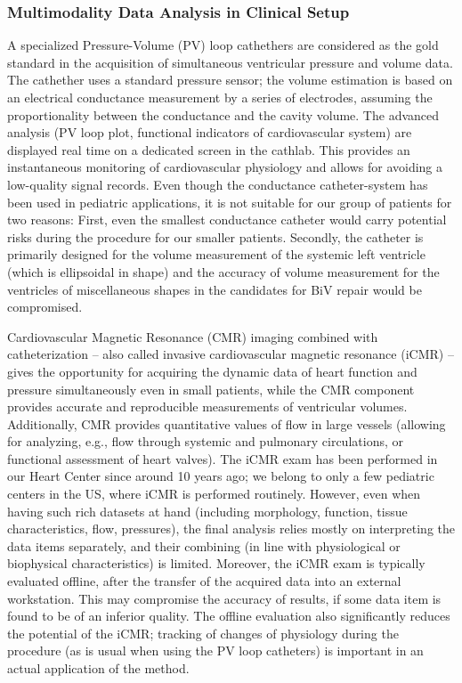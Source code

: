 \subsubsection{Multimodality Data Analysis in Clinical Setup}
A specialized Pressure-Volume (PV) loop cathethers are considered as the gold standard in the acquisition of simultaneous ventricular pressure and volume data. The cathether uses a standard pressure sensor; the volume estimation is based on an electrical conductance measurement by a series of electrodes, assuming the proportionality between the conductance and the cavity volume. 
The advanced analysis (PV loop plot, functional indicators of cardiovascular system) are displayed real time on a dedicated screen in the cathlab. This  provides an instantaneous monitoring of cardiovascular physiology and allows for avoiding a low-quality signal records.  Even though the conductance catheter-system has been used in pediatric applications\cite{hiremath2023_PVloop_review}, it is not suitable for our group of patients for two reasons: First, even the smallest conductance catheter would carry potential risks during the procedure for our smaller patients. Secondly, the catheter is primarily designed for the volume measurement of the systemic left ventricle (which is ellipsoidal in shape) and the accuracy of volume measurement for the ventricles of miscellaneous shapes in the candidates for BiV repair would be compromised.

Cardiovascular Magnetic Resonance (CMR) imaging combined with catheterization -- also called invasive cardiovascular magnetic resonance  (iCMR)\cite{reddy2020_iCMR} -- gives the opportunity for acquiring the dynamic data of heart function and pressure simultaneously even in small patients, while the CMR component provides accurate and reproducible measurements of ventricular volumes. Additionally, CMR provides quantitative values of flow in large vessels (allowing for analyzing, e.g., flow through systemic and pulmonary circulations, or functional assessment of heart valves). The iCMR exam has been performed in our Heart Center since around 10 years ago; we belong to only a few pediatric centers in the US, where iCMR is performed routinely. 
However, even when having such rich datasets at hand (including morphology, function, tissue characteristics, flow, pressures), the final analysis relies mostly on interpreting the data items separately, and their combining (in line with physiological or biophysical characteristics) is limited. Moreover, the iCMR exam is typically evaluated offline, after the transfer of the acquired data into an external workstation. This may compromise the accuracy of results, if some data item is found to be of an inferior quality. The offline evaluation also significantly reduces the potential of the iCMR; tracking of changes of physiology during the procedure (as is usual when using the PV loop catheters) is important in an actual application of the method.


